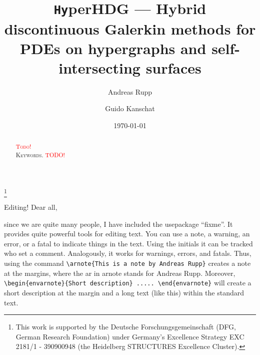 \documentclass[a4paper, english, 12pt, reqno, draft]{amsart}
\theoremstyle{definition}
\theoremstyle{remark}
\numberwithin{equation}{section}
\newcommand{\hyperHDG}{{\fontfamily{pzc}\selectfont \texttt{Hy}\hspace{-1.5pt}perHDG }}
\begin{document}
\title[\hyperHDG --- HDG on hypergraphs]{\hyperHDG --- Hybrid discontinuous Galerkin methods for PDEs on hypergraphs and self-intersecting surfaces} 

\author{Andreas Rupp}
\address{Interdisciplinary Center for Scientific Computing (IWR), Heidelberg University, Mathematikon, Im Neuenheimer Feld 205, 69120 Heidelberg, Germany}
\thanks{This work is supported by the Deutsche Forschungsgemeinschaft (DFG, German Research Foundation) under Germany's Excellence Strategy EXC 2181/1 - 390900948 (the Heidelberg STRUCTURES Excellence Cluster).}

\author{Guido Kanschat}
\address{Interdisciplinary Center for Scientific Computing (IWR) and Mathematics Center Heidelberg (MATCH), Heidelberg University, Mathematikon, Im Neuenheimer Feld 205, 69120 Heidelberg, Germany}

\subjclass[2010]{\textcolor{red}{TODO}}

\date{\today}


\begin{abstract}
 \textcolor{red}{\textsc{Todo!}} 
 \\[1ex] \noindent \textsc{Keywords.}
 \textcolor{red}{TODO!}
\end{abstract}
% 
\allowdisplaybreaks
\maketitle
% 

\begin{envarnote}{Editing!}
 Dear all,
 
 since we are quite many people, I have included the usepackage ``fixme''. It provides quite powerful tools for editing text. You can use a note, a warning, an error, or a fatal to indicate things in the text. Using the initials it can be tracked who set a comment. Analogously, it works for warnings, errors, and fatals. Thus, using the command \verb|\arnote{This is a note by Andreas Rupp}| creates a note at the margins, where the ar in arnote stands for Andreas Rupp. Moreover, \verb|\begin{envarnote}{Short description} ..... \end{envarnote}| \linebreak will create a short description at the margin and a long text (like this) within the standard text.
\end{envarnote}
% 
\end{document}
